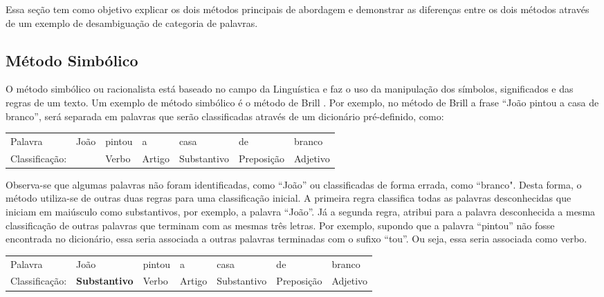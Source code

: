 Essa seção tem como objetivo explicar os dois métodos principais de
abordagem e demonstrar as diferenças entre os dois métodos através de um exemplo
de desambiguação de categoria de palavras.


\subsection{Método Simbólico} 
O método simbólico ou racionalista está
baseado no campo da Linguística e faz o uso da manipulação dos símbolos,
significados e das regras de um texto. Um exemplo de método simbólico é o
método de Brill \cite{Brill:1992:SRP:974499.974526}. Por exemplo, no método de
Brill a frase ``João pintou a casa de branco'', será separada em palavras que
serão classificadas através de um dicionário pré-definido, como:

\begin{table}[htb]
\centering
\begin{tabular}{l|l|l|l|l|l|l}
Palavra         & João        & pintou & a      & casa        & de        
& branco
         \\
Classificação:   & 			   & Verbo  & Artigo & Substantivo & Preposição & Adjetivo
\end{tabular}
\label{my-label}
\end{table}

Observa-se que algumas palavras não foram
identificadas, como ``João'' ou classificadas de forma errada, como
``branco". Desta forma, o método utiliza-se de outras duas regras para uma
classificação inicial.
A primeira regra classifica todas as palavras desconhecidas que iniciam em
maiúsculo como substantivos, por exemplo, a palavra ``João''. Já a segunda regra, atribui para a palavra desconhecida a mesma classificação
de outras palavras que terminam com as mesmas três letras. Por exemplo, supondo
que a palavra ``pintou'' não fosse encontrada no dicionário, essa seria
associada a outras palavras terminadas com o sufixo ``tou''. Ou seja, essa seria
associada como verbo.

\begin{table}[htb]
\centering
\begin{tabular}{l|l|l|l|l|l|l}
Palavra         & João        & pintou & a      & casa        & de        
& branco
         \\
Classificação:   & \textbf{Substantivo} & Verbo  & Artigo & Substantivo &
Preposição & Adjetivo
\end{tabular}
\label{my-label}
\end{table}



